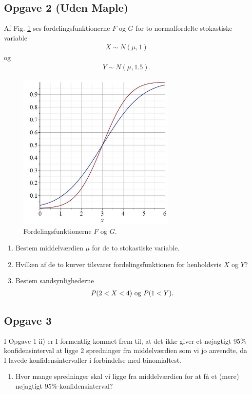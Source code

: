 \subsection*{Opgave 2 (Uden Maple)}
	Af Fig. \ref{fig:fordeling} ses fordelingsfunktionerne $F$ og $G$ for to normalfordelte stokastiske variable
	\begin{align*}
		X \sim N(\mu,1)
	\end{align*}
	og 
	\begin{align*}
		Y \sim N(\mu,1.5).
	\end{align*}
	\begin{figure}[H]
		\centering
		\includegraphics[width=0.7\textwidth]{Billeder/fordelingafl.jpg}
		\caption{Fordelingsfunktionerne $F$ og $G$.}
		\label{fig:fordeling}
	\end{figure}
\begin{enumerate}[label=\roman*)]
	\item Bestem middelværdien $\mu$ for de to stokastiske variable.
	\item Hvilken af de to kurver tilsvarer fordelingsfunktionen for henholdsvis $X$ og $Y$?
	\item Bestem sandsynlighederne
		\begin{align*}
			P(2<X<4) \textnormal{ og } P(1<Y).
		\end{align*}
\end{enumerate}


\subsection*{Opgave 3}

I Opgave 1 ii) er I formentlig kommet frem til, at det ikke giver et nøjagtigt 95$\%$- konfidensinterval at ligge 2 spredninger fra middelværdien som vi jo anvendte, da I lavede konfidensintervaller i forbindelse med binomialtest. 
\begin{enumerate}[label=\roman*)]
	\item Hvor mange spredninger skal vi ligge fra middelværdien for at få et (mere) nøjagtigt
	$95\%$-konfidensinterval?
\end{enumerate}

